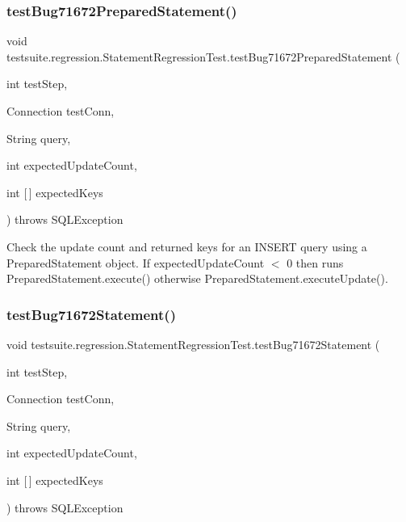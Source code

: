 \subsubsection{\texorpdfstring{test\+Bug71672\+Prepared\+Statement()}{testBug71672PreparedStatement()}}
{\footnotesize\ttfamily void testsuite.\+regression.\+Statement\+Regression\+Test.\+test\+Bug71672\+Prepared\+Statement (\begin{DoxyParamCaption}\item[{int}]{test\+Step,  }\item[{Connection}]{test\+Conn,  }\item[{String}]{query,  }\item[{int}]{expected\+Update\+Count,  }\item[{int \mbox{[}$\,$\mbox{]}}]{expected\+Keys }\end{DoxyParamCaption}) throws S\+Q\+L\+Exception}

Check the update count and returned keys for an I\+N\+S\+E\+RT query using a Prepared\+Statement object. If expected\+Update\+Count $<$ 0 then runs Prepared\+Statement.\+execute() otherwise Prepared\+Statement.\+execute\+Update(). \mbox{\label{classtestsuite_1_1regression_1_1_statement_regression_test_abb13639717a457989454d73d4dbc02b8}} 
\subsubsection{\texorpdfstring{test\+Bug71672\+Statement()}{testBug71672Statement()}}
{\footnotesize\ttfamily void testsuite.\+regression.\+Statement\+Regression\+Test.\+test\+Bug71672\+Statement (\begin{DoxyParamCaption}\item[{int}]{test\+Step,  }\item[{Connection}]{test\+Conn,  }\item[{String}]{query,  }\item[{int}]{expected\+Update\+Count,  }\item[{int \mbox{[}$\,$\mbox{]}}]{expected\+Keys }\end{DoxyParamCaption}) throws S\+Q\+L\+Exception}

